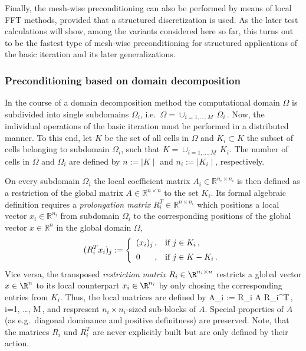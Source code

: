Finally, the mesh-wise preconditioning can also be performed by means of local FFT methods, provided that a structured discretization is used. As the later test calculations will show, among the variants considered here so far, this turns out to be the fastest type of mesh-wise preconditioning for structured applications of the basic iteration and its later generalizations. 

\subsubsection{Preconditioning based on domain decomposition}
\label{SEC_SCARC_block_precon}

In the course of a domain decomposition method the computational domain $\Omega$ is subdivided into single subdomains $\Omega_i$, i.e.\ 
$\Omega=\cup_{i=1, \dots, M} \,\Omega_i\,$. Now, the individual operations of the basic iteration must be performed in a distributed manner.
%
To this end, let $K$ be the set of all cells in $\Omega$ and $K_i \subset K$ the subset of cells belonging to subdomain $\Omega_i$, such that $K=\cup_{i=1, \dots, M}\, K_i$.
The number of cells in $\Omega$ and $\Omega_i$ are defined by $n := \mid\!\! K \!\!\mid$ 
and $n_i := \mid\!\! K_i \!\!\mid$, respectively.

On every subdomain $\Omega_i$ the local coefficient matrix $A_i \in \mathbb{R}^{n_i \times n_i}$ is
then defined as a restriction of the global matrix $A \in \mathbb{R}^{n \times n}$ to the
set $K_i$.  %
%
Its formal algebraic definition requires a {\it prolongation matrix} $R_i^T \in \mathbb{R}^{n \times n_i}$ which
positions a local vector $x_i \in \mathbb{R}^{n_i}$ from subdomain $\Omega_i$ 
to the corresponding positions of the global vector $x \in \mathbb{R}^n$ in the global domain $\Omega$,%
\[
(R_i^T x_i)_j :=
 \left\{
  \begin{array}{l@{\,, \quad }l}
   (x_i)_j & \mbox{if $j \in K_i  \,,$} \\[1.2ex]
   0       & \mbox{if $j \in K-K_i\,.$} 
  \end{array}
 \right.
\]
Vice versa, the transposed {\it restriction matrix} $R_i \in \R^{n_i \times n}$ restricts a global vector $x\in \R^n$ to its local counterpart $x_i \in \R^{n_i}$ by only chosing the corresponding entries from $K_i$.  
Thus, the local matrices are defined by
\be
A_i := R_i A R_i^T\,, \qquad i=1, \ldots, M\,,
\label{EQ_SCARC_subdomain_matrices}
\ee
and respresent $n_i \!\times\! n_i$-sized sub-blocks of $A$. Special properties of $A$ (as e.g.\ diagonal dominance and positive definitness) are preserved. Note, that the matrices $R_i$ und $R_i^T$ are never explicitly built but are only defined by their action.

